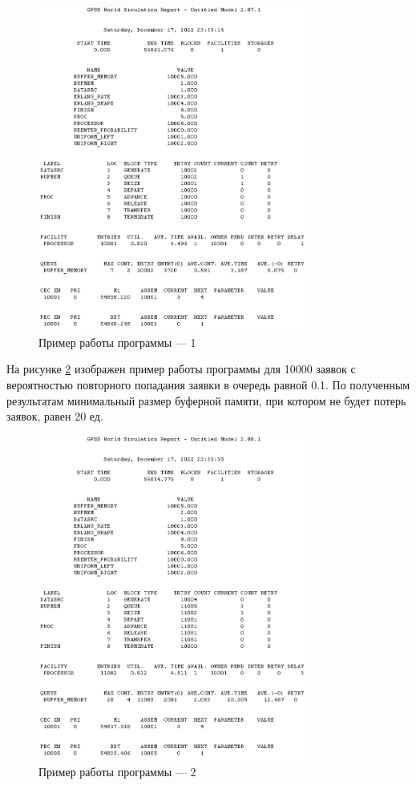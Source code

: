 \documentclass[12pt]{report}
\begin{document}
\begin{figure}[h!btp]
	\centering
	\includegraphics[width=0.8\textwidth]{inc/pic1.png}
	\caption{Пример работы программы --- 1}
	\label{fig:pic1}	
\end{figure}
\clearpage

На рисунке \ref{fig:pic2} изображен пример работы программы для 10000 заявок с вероятностью повторного попадания заявки в очередь равной 0.1. По полученным результатам минимальный размер буферной памяти, при котором не будет потерь заявок, равен 20 ед.

\begin{figure}[h!btp]
	\centering
	\includegraphics[width=0.8\textwidth]{inc/pic2.png}
	\caption{Пример работы программы --- 2}
	\label{fig:pic2}	
\end{figure}
\clearpage
\end{document}
